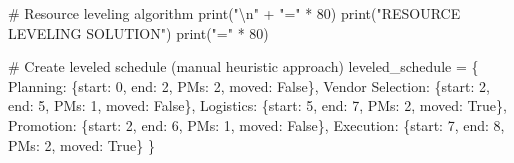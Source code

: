 \documentclass[
  letterpaper,
  DIV=11,
  numbers=noendperiod]{scrreprt}
\newenvironment{Shaded}{\begin{snugshade}}{\end{snugshade}}
\newcommand{\BuiltInTok}[1]{\textcolor[rgb]{0.00,0.23,0.31}{#1}}
\newcommand{\CharTok}[1]{\textcolor[rgb]{0.13,0.47,0.30}{#1}}
\newcommand{\CommentTok}[1]{\textcolor[rgb]{0.37,0.37,0.37}{#1}}
\newcommand{\DecValTok}[1]{\textcolor[rgb]{0.68,0.00,0.00}{#1}}
\newcommand{\NormalTok}[1]{\textcolor[rgb]{0.00,0.23,0.31}{#1}}
\newcommand{\OperatorTok}[1]{\textcolor[rgb]{0.37,0.37,0.37}{#1}}
\newcommand{\StringTok}[1]{\textcolor[rgb]{0.13,0.47,0.30}{#1}}
\newcommand{\VariableTok}[1]{\textcolor[rgb]{0.07,0.07,0.07}{#1}}
\begin{document}
\begin{Shaded}
\begin{Highlighting}[]
    \CommentTok{\# Resource leveling algorithm}
    \BuiltInTok{print}\NormalTok{(}\StringTok{"}\CharTok{\textbackslash{}n}\StringTok{"} \OperatorTok{+} \StringTok{"="} \OperatorTok{*} \DecValTok{80}\NormalTok{)}
    \BuiltInTok{print}\NormalTok{(}\StringTok{"RESOURCE LEVELING SOLUTION"}\NormalTok{)}
    \BuiltInTok{print}\NormalTok{(}\StringTok{"="} \OperatorTok{*} \DecValTok{80}\NormalTok{)}
    
    \CommentTok{\# Create leveled schedule (manual heuristic approach)}
\NormalTok{    leveled\_schedule }\OperatorTok{=}\NormalTok{ \{}
        \StringTok{\textquotesingle{}Planning\textquotesingle{}}\NormalTok{: \{}\StringTok{\textquotesingle{}start\textquotesingle{}}\NormalTok{: }\DecValTok{0}\NormalTok{, }\StringTok{\textquotesingle{}end\textquotesingle{}}\NormalTok{: }\DecValTok{2}\NormalTok{, }\StringTok{\textquotesingle{}PMs\textquotesingle{}}\NormalTok{: }\DecValTok{2}\NormalTok{, }\StringTok{\textquotesingle{}moved\textquotesingle{}}\NormalTok{: }\VariableTok{False}\NormalTok{\},}
        \StringTok{\textquotesingle{}Vendor Selection\textquotesingle{}}\NormalTok{: \{}\StringTok{\textquotesingle{}start\textquotesingle{}}\NormalTok{: }\DecValTok{2}\NormalTok{, }\StringTok{\textquotesingle{}end\textquotesingle{}}\NormalTok{: }\DecValTok{5}\NormalTok{, }\StringTok{\textquotesingle{}PMs\textquotesingle{}}\NormalTok{: }\DecValTok{1}\NormalTok{, }\StringTok{\textquotesingle{}moved\textquotesingle{}}\NormalTok{: }\VariableTok{False}\NormalTok{\},}
        \StringTok{\textquotesingle{}Logistics\textquotesingle{}}\NormalTok{: \{}\StringTok{\textquotesingle{}start\textquotesingle{}}\NormalTok{: }\DecValTok{5}\NormalTok{, }\StringTok{\textquotesingle{}end\textquotesingle{}}\NormalTok{: }\DecValTok{7}\NormalTok{, }\StringTok{\textquotesingle{}PMs\textquotesingle{}}\NormalTok{: }\DecValTok{2}\NormalTok{, }\StringTok{\textquotesingle{}moved\textquotesingle{}}\NormalTok{: }\VariableTok{True}\NormalTok{\},}
        \StringTok{\textquotesingle{}Promotion\textquotesingle{}}\NormalTok{: \{}\StringTok{\textquotesingle{}start\textquotesingle{}}\NormalTok{: }\DecValTok{2}\NormalTok{, }\StringTok{\textquotesingle{}end\textquotesingle{}}\NormalTok{: }\DecValTok{6}\NormalTok{, }\StringTok{\textquotesingle{}PMs\textquotesingle{}}\NormalTok{: }\DecValTok{1}\NormalTok{, }\StringTok{\textquotesingle{}moved\textquotesingle{}}\NormalTok{: }\VariableTok{False}\NormalTok{\},}
        \StringTok{\textquotesingle{}Execution\textquotesingle{}}\NormalTok{: \{}\StringTok{\textquotesingle{}start\textquotesingle{}}\NormalTok{: }\DecValTok{7}\NormalTok{, }\StringTok{\textquotesingle{}end\textquotesingle{}}\NormalTok{: }\DecValTok{8}\NormalTok{, }\StringTok{\textquotesingle{}PMs\textquotesingle{}}\NormalTok{: }\DecValTok{2}\NormalTok{, }\StringTok{\textquotesingle{}moved\textquotesingle{}}\NormalTok{: }\VariableTok{True}\NormalTok{\}}
\NormalTok{    \}}
    

\end{Highlighting}
\end{Shaded}
\end{document}
